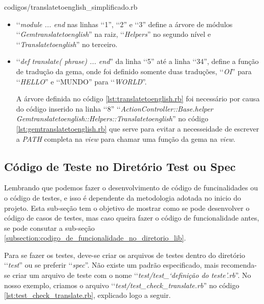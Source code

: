 
{codigos/translatetoenglish_simplificado.rb}

\begin{itemize}

  \item ‘‘\emph{module ... end} nas linhas ‘‘1'', ‘‘2'' e ‘‘3'' define a árvore de módulos
  ‘‘\emph{Gemtranslatetoenglish}'' na raiz, ‘‘\emph{Helpers}'' no segundo nível e ‘‘\emph{Translatetoenglish}'' no
  terceiro.
  
  \item ‘‘\emph{def translate( phrase) ... end}'' da linha ‘‘5'' até a linha ‘‘34'', define
  a função de tradução da gema, onde foi definido somente duas traduções, ‘‘\emph{OI}''
  para ‘‘\emph{HELLO}'' e ‘‘MUNDO'' para ‘‘\emph{WORLD}''.

  A árvore definida no código \ref{lst:translatetoenglish.rb} foi necessário por causa do código
  inserido na linha ‘‘8'' ‘‘\emph{ActionController::Base.helper Gemtranslatetoenglish::Helpers::Translatetoenglish}''
  no código \ref{lst:gemtranslatetoenglish.rb} que serve para evitar a necesseidade de escrever a
  \emph{PATH} completa na \emph{view} para chamar uma função da gema na \emph{view}.

\end{itemize}


\subsection{Código de Teste no Diretório Test ou Spec}
\label{subsection:codigo_de_teste_no_diretorio_test_ou_spec}

Lembrando que podemos fazer o desenvolvimento de código de funcinalidades ou o código de testes, e isso é
dependente da metodologia adotada no inicio do projeto. Esta sub-seção tem o objetivo de mostrar como se pode
desenvolver o código de casos de testes, mas caso queira fazer o código de funcionalidade antes, se pode
consutar a sub-seção \ref{subsection:codigo_de_funcionalidade_no_diretorio_lib}.

Para se fazer os testes, deve-se criar os arquivos de testes dentro do diretório ‘‘\emph{test}'' ou se
preferir ‘‘\emph{spec}''. Não existe um padrão especificado, mais recomenda-se criar um arquivo de
teste com o nome ‘‘\emph{test/test\_‘definição do teste'.rb}''. No nosso exemplo, criamos o arquivo
‘‘\emph{test/test\_check\_translate.rb}'' no código \ref{lst:test_check_translate.rb},
explicado logo a seguir.


